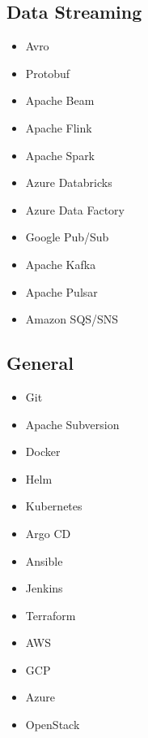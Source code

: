 \documentclass[letterpaper]{resume}
\begin{document}
\begin{minipage}[t]{0.22\columnwidth}
\sectionspace

\subsection{Data Streaming}
\vspace{2pt}
\begin{itemize}
\item Avro
\item Protobuf
\item Apache Beam
\item Apache Flink
\item Apache Spark
\item Azure Databricks
\item Azure Data Factory
\item Google Pub/Sub
\item Apache Kafka
\item Apache Pulsar
\item Amazon SQS/SNS
\end{itemize}

\sectionspace

\subsection{General}
\vspace{2pt}
\begin{itemize}
\item Git
\item Apache Subversion
\item Docker
\item Helm
\item Kubernetes
\item Argo CD
\item Ansible
\item Jenkins
\item Terraform
\item AWS
\item GCP
\item Azure
\item OpenStack
\end{itemize}

\sectionspace

\end{minipage}
\hfill
\end{document}
